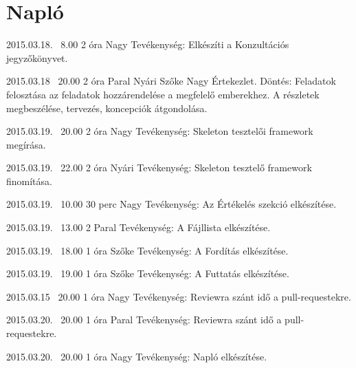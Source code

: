 %
\section{Napló}

\begin{naplo}
	
	\bejegyzes
	{2015.03.18. ~8.00}
	{2 óra}
    {Nagy} 
	{Tevékenység: Elkészíti a Konzultációs jegyzőkönyvet.\newline } 
	
	\bejegyzes
	{2015.03.18 ~20.00}
	{2 óra}
	{Paral \newline Nyári \newline Szőke \newline Nagy} 
	{Értekezlet.
		Döntés: Feladatok felosztása az feladatok hozzárendelése a megfelelő emberekhez. A részletek megbeszélése, tervezés, koncepciók átgondolása.\newline } 
			
	
	\bejegyzes
	{2015.03.19. ~20.00}
	{2 óra}
	{Nagy} 
	{Tevékenység: Skeleton tesztelői framework megírása.\newline } 
		
	\bejegyzes
	{2015.03.19. ~22.00}
	{2 óra}
	{Nyári} 
	{Tevékenység: Skeleton tesztelő framework finomítása.\newline } 
		
    	
	\bejegyzes
	{2015.03.19. ~10.00}
	{30 perc}
	{Nagy} 
	{Tevékenység: Az Értékelés szekció elkészítése.\newline } 
		
    
    \bejegyzes
    {2015.03.19. ~13.00}
    {2}
    {Paral} 
    {Tevékenység: A Fájllista elkészítése.\newline } 
        
    \bejegyzes
    {2015.03.19. ~18.00}
    {1 óra}
    {Szőke} 
    {Tevékenység: A Fordítás elkészítése.\newline } 

    \bejegyzes
    {2015.03.19. ~19.00}
    {1 óra}
    {Szőke} 
    {Tevékenység: A Futtatás elkészítése.\newline } 

    \bejegyzes
	{2015.03.15 ~20.00}
	{1 óra}
	{Nagy} 
	{Tevékenység: Reviewra szánt idő a pull-requestekre.\newline } 
	
	\bejegyzes
	{2015.03.20. ~20.00}
	{1 óra}
	{Paral} 
	{Tevékenység: Reviewra szánt idő a pull-requestekre.\newline } 
			
	\bejegyzes
	{2015.03.20. ~20.00}
	{1 óra}
	{Nagy} 
	{Tevékenység: Napló elkészítése.\newline } 
	
\end{naplo}



